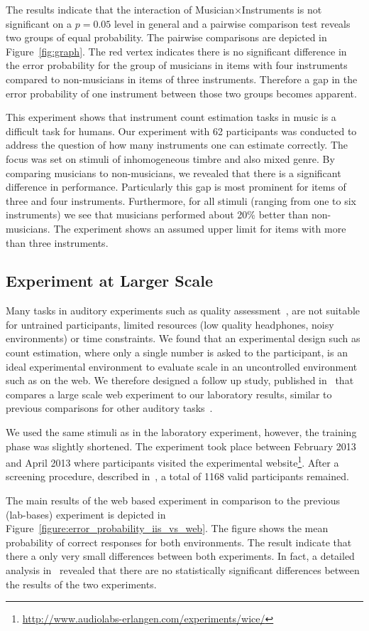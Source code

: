 The results indicate that the interaction of Musician$\times$Instruments is not significant on a $p=0.05$ level in general and a pairwise comparison test reveals two groups of equal probability. The pairwise comparisons are depicted in Figure~\ref{fig:graph}. The red vertex indicates there is no significant difference in the error probability for the group of musicians in items with four instruments compared to non-musicians in items of three instruments. Therefore a gap in the error probability of one instrument between those two groups becomes apparent.
\par
This experiment shows that instrument count estimation tasks in music is a difficult task for humans. Our experiment with 62 participants was conducted to address the question of how many instruments one can estimate correctly.
The focus was set on stimuli of inhomogeneous timbre and also mixed genre. By comparing musicians to non-musicians, we revealed that there is a significant difference in performance. Particularly this gap is most prominent for items of three and four instruments. Furthermore, for all stimuli (ranging from one to six instruments) we see that musicians performed about 20\% better than non-musicians. The experiment shows an assumed upper limit for items with more than three instruments.

\subsection{Experiment at Larger Scale}

Many tasks in auditory experiments such as quality assessment~\cite{recommendation2001MUSHRA}, are not suitable for untrained participants, limited resources (low quality headphones, noisy environments) or time constraints.
We found that an experimental design such as count estimation, where only a single number is asked to the participant, is an ideal experimental environment to evaluate scale in an uncontrolled environment such as on the web.
We therefore designed a follow up study, published in~\cite{schoeffler13} that compares a large scale web experiment to our  laboratory results, similar to previous comparisons for other auditory tasks~\cite{Welch1996, lee2010, Salganik2006, Reips2012}.
\par
We used the same stimuli as in the laboratory experiment, however, the training phase was slightly shortened.
The experiment took place between February 2013 and April 2013 where participants visited the experimental website\footnote{{\scriptsize\url{http://www.audiolabs-erlangen.com/experiments/wice/}}}.
After a screening procedure, described in~\cite{schoeffler13}, a total of 1168 valid participants remained.
\par
The main results of the web based experiment in comparison to the previous (lab-bases) experiment is depicted in Figure~\ref{figure:error_probability_iis_vs_web}.
The figure shows the mean probability of correct responses for both environments.
The result indicate that there a only very small differences between both experiments. 
In fact, a detailed analysis in~\cite{schoeffler13} revealed that there are no statistically significant differences between the results of the two experiments. 


